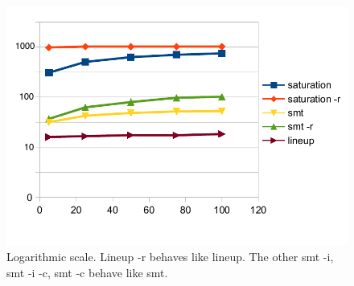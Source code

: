 \begin{figure}[t]
  \centering
  \includegraphics[width=\linewidth]{figures/chart_final}
  \caption{Logarithmic scale. Lineup -r behaves like lineup. The other smt -i, smt -i -c, smt -c behave like smt.
  }
  \label{fig:data:chart}
\end{figure}






